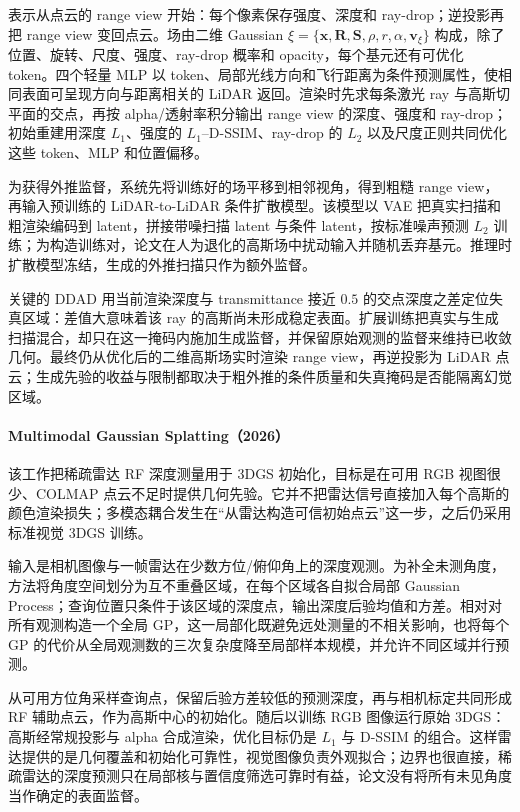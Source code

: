 表示从点云的 range view 开始：每个像素保存强度、深度和 ray-drop；逆投影再把 range view 变回点云。场由二维 Gaussian $\xi=\{\mathbf x,\mathbf R,\mathbf S,\rho,r,\alpha,\mathbf v_\xi\}$ 构成，除了位置、旋转、尺度、强度、ray-drop 概率和 opacity，每个基元还有可优化 token。四个轻量 MLP 以 token、局部光线方向和飞行距离为条件预测属性，使相同表面可呈现方向与距离相关的 LiDAR 返回。渲染时先求每条激光 ray 与高斯切平面的交点，再按 alpha/透射率积分输出 range view 的深度、强度和 ray-drop；初始重建用深度 $L_1$、强度的 $L_1$--D-SSIM、ray-drop 的 $L_2$ 以及尺度正则共同优化这些 token、MLP 和位置偏移。

为获得外推监督，系统先将训练好的场平移到相邻视角，得到粗糙 range view，再输入预训练的 LiDAR-to-LiDAR 条件扩散模型。该模型以 VAE 把真实扫描和粗渲染编码到 latent，拼接带噪扫描 latent 与条件 latent，按标准噪声预测 $L_2$ 训练；为构造训练对，论文在人为退化的高斯场中扰动输入并随机丢弃基元。推理时扩散模型冻结，生成的外推扫描只作为额外监督。

关键的 DDAD 用当前渲染深度与 transmittance 接近 $0.5$ 的交点深度之差定位失真区域：差值大意味着该 ray 的高斯尚未形成稳定表面。扩展训练把真实与生成扫描混合，却只在这一掩码内施加生成监督，并保留原始观测的监督来维持已收敛几何。最终仍从优化后的二维高斯场实时渲染 range view，再逆投影为 LiDAR 点云；生成先验的收益与限制都取决于粗外推的条件质量和失真掩码是否能隔离幻觉区域。

\paragraph{Multimodal Gaussian Splatting（2026）\cite{2602_17124}}
该工作把稀疏雷达 RF 深度测量用于 3DGS 初始化，目标是在可用 RGB 视图很少、COLMAP 点云不足时提供几何先验。它并不把雷达信号直接加入每个高斯的颜色渲染损失；多模态耦合发生在“从雷达构造可信初始点云”这一步，之后仍采用标准视觉 3DGS 训练。

输入是相机图像与一帧雷达在少数方位/俯仰角上的深度观测。为补全未测角度，方法将角度空间划分为互不重叠区域，在每个区域各自拟合局部 Gaussian Process；查询位置只条件于该区域的深度点，输出深度后验均值和方差。相对对所有观测构造一个全局 GP，这一局部化既避免远处测量的不相关影响，也将每个 GP 的代价从全局观测数的三次复杂度降至局部样本规模，并允许不同区域并行预测。

从可用方位角采样查询点，保留后验方差较低的预测深度，再与相机标定共同形成 RF 辅助点云，作为高斯中心的初始化。随后以训练 RGB 图像运行原始 3DGS：高斯经常规投影与 alpha 合成渲染，优化目标仍是 $L_1$ 与 D-SSIM 的组合。这样雷达提供的是几何覆盖和初始化可靠性，视觉图像负责外观拟合；边界也很直接，稀疏雷达的深度预测只在局部核与置信度筛选可靠时有益，论文没有将所有未见角度当作确定的表面监督。

